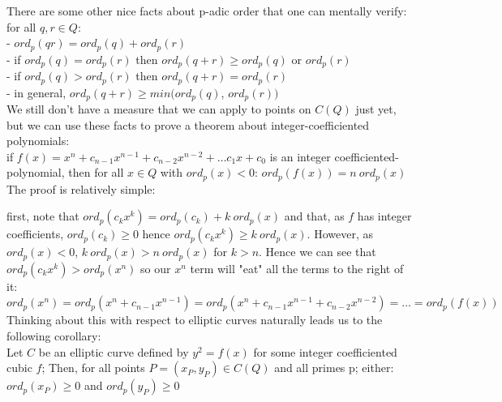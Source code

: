 \documentclass{article}
\begin{document}
There are some other nice facts about p-adic order that one can mentally verify:\\

for all $q, r \in Q$:\\

- $ord_p(qr) = ord_p(q) + ord_p(r)$\\

- if $ord_p(q) = ord_p(r)$ then $ord_p(q + r)  \geq ord_p(q)$ or $ord_p(r)$\\

- if $ord_p(q) > ord_p(r)$ then $ord_p(q + r) = ord_p(r)$\\

- in general, $ord_p(q + r) \geq min(ord_p(q)$, $ord_p(r))$\\

We still don't have a measure that we can apply to points on $C(Q)$ just yet, but we can use these facts to prove a theorem about integer-coefficiented polynomials:\\

if $f(x) = x^n + c_{n-1}x^{n-1} + c_{n-2}x^{n-2} + \dots c_1 x + c_0$ is an integer coefficiented-polynomial, then for all $x \in Q$ with $ord_p(x) < 0$: $ord_p(f(x)) = n \ ord_p(x)$\\

The proof is relatively simple:

first, note that $ord_p(c_k x^k) = ord_p(c_k) + k \ ord_p(x)$ and that, as $f$ has integer coefficients, $ord_p(c_k) \geq 0$ hence $ord_p(c_k x^k) \geq k \ ord_p(x)$. However, as $ord_p(x) < 0$, $k \ ord_p(x) > n \ ord_p(x)$ for $k > n$. Hence we can see that $ord_p(c_k x^k) > ord_p(x^n)$ so our $x^n$ term will "eat" all the terms to the right of it:\\

$ord_p(x^n) = ord_p(x^n + c_{n-1}x^{n-1}) = ord_p(x^n + c_{n-1}x^{n-1} + c_{n-2}x^{n-2}) = \dots = ord_p(f(x))$\\


Thinking about this with respect to elliptic curves naturally leads us to the following corollary:\\

Let $C$ be an elliptic curve defined by $y^2 = f(x)$ for some integer coefficiented cubic $f$; Then, for all points $P = (x_P, y_P) \in C(Q)$ and all primes p; either:\\

$ord_p(x_P) \geq 0$ \quad and \quad  $ord_p(y_P) \geq 0$ \\
\end{document}
